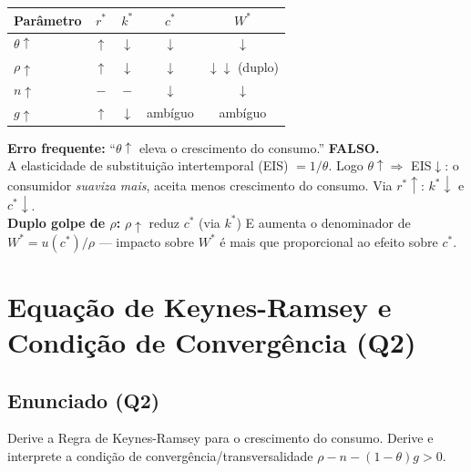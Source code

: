\documentclass[12pt, a4paper]{article}
\begin{document}
\begin{resultbox}[title={Resumo da Estática Comparativa (Q1)}]
\begin{center}
\begin{tabular}{lcccc}
\toprule
Parâmetro & $r^*$ & $k^*$ & $c^*$ & $W^*$ \\
\midrule
$\theta\uparrow$ & $\uparrow$ & $\downarrow$ & $\downarrow$ & $\downarrow$ \\
$\rho\uparrow$   & $\uparrow$ & $\downarrow$ & $\downarrow$ & $\downarrow\downarrow$ (duplo) \\
$n\uparrow$      & $-$        & $-$          & $\downarrow$ & $\downarrow$ \\
$g\uparrow$      & $\uparrow$ & $\downarrow$ & ambíguo      & ambíguo \\
\bottomrule
\end{tabular}
\end{center}
\end{resultbox}

\begin{provabox}[title={P1 2024 Q1 --- Erro Clássico}]
\textbf{Erro frequente:} ``$\theta\uparrow$ eleva o crescimento do consumo.'' \textbf{FALSO.}\\
A elasticidade de substituição intertemporal (EIS) $= 1/\theta$. Logo $\theta\uparrow \Rightarrow$ EIS$\downarrow$: o consumidor \emph{suaviza mais}, aceita menos crescimento do consumo. Via $r^*\uparrow$: $k^*\downarrow$ e $c^*\downarrow$.\\
\textbf{Duplo golpe de $\rho$:} $\rho\uparrow$ reduz $c^*$ (via $k^*$) E aumenta o denominador de $W^*=u(c^*)/\rho$ --- impacto sobre $W^*$ é mais que proporcional ao efeito sobre $c^*$.
\end{provabox}

\section{Equação de Keynes-Ramsey e Condição de Convergência (Q2)}

\subsection*{Enunciado (Q2)}

Derive a Regra de Keynes-Ramsey para o crescimento do consumo. Derive e interprete a condição de convergência/transversalidade $\rho - n - (1-\theta)g > 0$.
\end{document}
